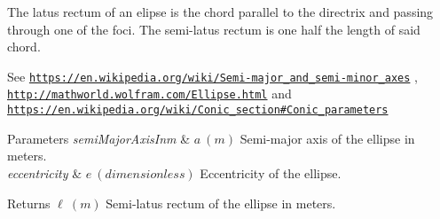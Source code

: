 The latus rectum of an elipse is the chord parallel to the directrix and passing through one of the foci. The semi-\/latus rectum is one half the length of said chord.

See \href{https://en.wikipedia.org/wiki/Semi-major_and_semi-minor_axes}{\tt https\+://en.\+wikipedia.\+org/wiki/\+Semi-\/major\+\_\+and\+\_\+semi-\/minor\+\_\+axes} , \href{http://mathworld.wolfram.com/Ellipse.html}{\tt http\+://mathworld.\+wolfram.\+com/\+Ellipse.\+html} and \href{https://en.wikipedia.org/wiki/Conic_section#Conic_parameters}{\tt https\+://en.\+wikipedia.\+org/wiki/\+Conic\+\_\+section\#\+Conic\+\_\+parameters}


\begin{DoxyParams}{Parameters}
{\em semi\+Major\+Axis\+Inm} & $ a\ (m)$ Semi-\/major axis of the ellipse in meters. \\
\hline
{\em eccentricity} & $ e\ (dimensionless)$ Eccentricity of the ellipse. \\
\hline
\end{DoxyParams}
\begin{DoxyReturn}{Returns}
$ \ell\ (m)$ Semi-\/latus rectum of the ellipse in meters. 
\end{DoxyReturn}
